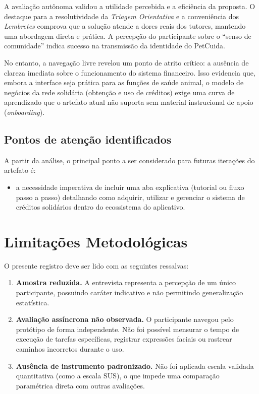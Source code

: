 \documentclass[12pt,a4paper]{article}
\begin{document}
A avaliação autônoma validou a utilidade percebida e a eficiência da proposta. O destaque para a resolutividade da \textit{Triagem Orientativa} e a conveniência dos \textit{Lembretes} comprova que a solução atende a dores reais dos tutores, mantendo uma abordagem direta e prática. A percepção do participante sobre o \enquote{senso de comunidade} indica sucesso na transmissão da identidade do PetCuida.

No entanto, a navegação livre revelou um ponto de atrito crítico: a ausência de clareza imediata sobre o funcionamento do sistema financeiro. Isso evidencia que, embora a interface seja prática para as funções de saúde animal, o modelo de negócios da rede solidária (obtenção e uso de créditos) exige uma curva de aprendizado que o artefato atual não suporta sem material instrucional de apoio (\textit{onboarding}).

\subsection{Pontos de atenção identificados}

A partir da análise, o principal ponto a ser considerado para futuras iterações do artefato é:

\begin{itemize}[leftmargin=*]
  \item a necessidade imperativa de incluir uma aba explicativa (tutorial ou fluxo passo a passo) detalhando como adquirir, utilizar e gerenciar o sistema de créditos solidários dentro do ecossistema do aplicativo.
\end{itemize}

\section{Limitações Metodológicas}

O presente registro deve ser lido com as seguintes ressalvas:

\begin{enumerate}[label=\textbf{\arabic*.}, leftmargin=*]
  \item \textbf{Amostra reduzida.} A entrevista representa a percepção de um único participante, possuindo caráter indicativo e não permitindo generalização estatística.
  \item \textbf{Avaliação assíncrona não observada.} O participante navegou pelo protótipo de forma independente. Não foi possível mensurar o tempo de execução de tarefas específicas, registrar expressões faciais ou rastrear caminhos incorretos durante o uso.
  \item \textbf{Ausência de instrumento padronizado.} Não foi aplicada escala validada quantitativa (como a escala SUS), o que impede uma comparação paramétrica direta com outras avaliações.
\end{enumerate}
\end{document}
